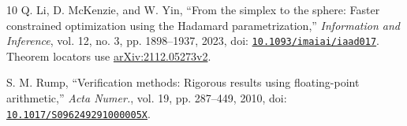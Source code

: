 \begin{thebibliography}{10}
Q. Li, D. McKenzie, and W. Yin, ``From the simplex to the sphere: Faster constrained optimization using the Hadamard parametrization,'' \emph{Information and Inference}, vol. 12, no. 3, pp. 1898--1937, 2023, doi: \href{https://doi.org/10.1093/imaiai/iaad017}{\nolinkurl{10.1093/imaiai/iaad017}}. Theorem locators use \href{https://arxiv.org/abs/2112.05273v2}{arXiv:2112.05273v2}.

 S. M. Rump, ``Verification methods: Rigorous results using floating-point arithmetic,'' \emph{Acta Numer.}, vol. 19, pp. 287--449, 2010, doi: \href{https://doi.org/10.1017/S096249291000005X}{\nolinkurl{10.1017/S096249291000005X}}.

\EOD
\end{thebibliography}
